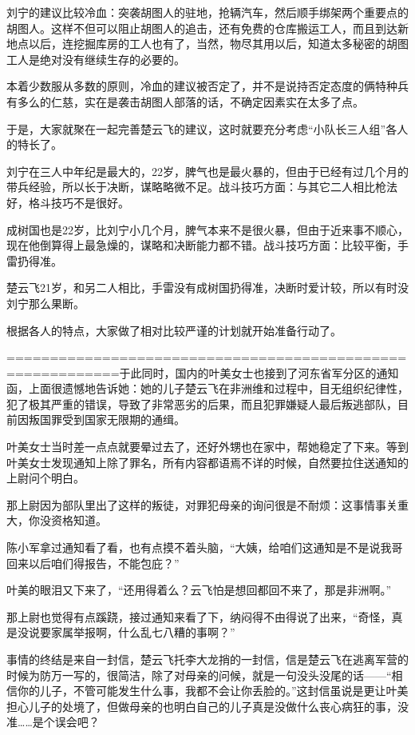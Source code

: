 刘宁的建议比较冷血：突袭胡图人的驻地，抢辆汽车，然后顺手绑架两个重要点的胡图人。这样不但可以阻止胡图人的追击，还有免费的仓库搬运工人，而且到达新地点以后，连挖掘库房的工人也有了，当然，物尽其用以后，知道太多秘密的胡图工人是绝对没有继续生存的必要的。

本着少数服从多数的原则，冷血的建议被否定了，并不是说持否定态度的俩特种兵有多么的仁慈，实在是袭击胡图人部落的话，不确定因素实在太多了点。

于是，大家就聚在一起完善楚云飞的建议，这时就要充分考虑“小队长三人组”各人的特长了。

刘宁在三人中年纪是最大的，22岁，脾气也是最火暴的，但由于已经有过几个月的带兵经验，所以长于决断，谋略略微不足。战斗技巧方面：与其它二人相比枪法好，格斗技巧不是很好。

成树国也是22岁，比刘宁小几个月，脾气本来不是很火暴，但由于近来事不顺心，现在他倒算得上最急燥的，谋略和决断能力都不错。战斗技巧方面：比较平衡，手雷扔得准。

楚云飞21岁，和另二人相比，手雷没有成树国扔得准，决断时爱计较，所以有时没刘宁那么果断。

根据各人的特点，大家做了相对比较严谨的计划就开始准备行动了。

===========================================================于此同时，国内的叶美女士也接到了河东省军分区的通知函，上面很遗憾地告诉她：她的儿子楚云飞在非洲维和过程中，目无组织纪律性，犯了极其严重的错误，导致了非常恶劣的后果，而且犯罪嫌疑人最后叛逃部队，目前因叛国罪受到国家无限期的通缉。

叶美女士当时差一点点就要晕过去了，还好外甥也在家中，帮她稳定了下来。等到叶美女士发现通知上除了罪名，所有内容都语焉不详的时候，自然要拉住送通知的上尉问个明白。

那上尉因为部队里出了这样的叛徒，对罪犯母亲的询问很是不耐烦：这事情事关重大，你没资格知道。

陈小军拿过通知看了看，也有点摸不着头脑，“大姨，给咱们这通知是不是说我哥回来以后咱们得报告，不能包庇？”

叶美的眼泪又下来了，“还用得着么？云飞怕是想回都回不来了，那是非洲啊。”

那上尉也觉得有点蹊跷，接过通知来看了下，纳闷得不由得说了出来，“奇怪，真是没说要家属举报啊，什么乱七八糟的事啊？”

事情的终结是来自一封信，楚云飞托李大龙捎的一封信，信是楚云飞在逃离军营的时候为防万一写的，很简洁，除了对母亲的问候，就是一句没头没尾的话——“相信你的儿子，不管可能发生什么事，我都不会让你丢脸的。”这封信虽说是更让叶美担心儿子的处境了，但做母亲的也明白自己的儿子真是没做什么丧心病狂的事，没准……是个误会吧？

